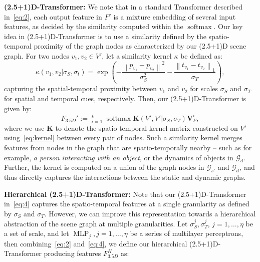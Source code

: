 \documentclass[letterpaper]{article} \usepackage{aaai22}  \usepackage{times}  \usepackage{helvet}  \usepackage{courier}  \usepackage[hyphens]{url}  \usepackage{graphicx} \urlstyle{rm} \def\UrlFont{\rm}  \usepackage{natbib}  \usepackage{caption} \DeclareCaptionStyle{ruled}{labelfont=normalfont,labelsep=colon,strut=off} \frenchspacing  \setlength{\pdfpagewidth}{8.5in}  \setlength{\pdfpageheight}{11in}  \usepackage{algorithm}
\newcommand{\graph}{\mathcal{G}}
\newcommand{\feat}{F}
\newcommand{\ftd}{F_{3.5D}}
\newcommand{\fhd}{F^H_{3.5D}}
\newcommand{\val}{\mathbf{V}}
\DeclareMathOperator*{\softmax}{softmax}
\DeclareMathOperator*{\concat}{||}
\DeclareMathOperator*{\MLP}{MLP}
\newcommand{\name}{(2.5+1)D\xspace}
\newcommand{\nameTxr}{(2.5+1)D-Transformer\xspace}
\newcommand{\nodes}{V}
\newcommand{\node}{v}
\newcommand{\kernel}{\kappa}
\newcommand{\Kernel}{\mathbf{K}}
\newcommand{\lnorm}[1]{\left\|{#1}\right\|_1}
\newcommand{\enorm}[1]{\left\|{#1}\right\|}
\begin{document}
\noindent\textbf{\nameTxr:}
We note that in a standard Transformer described in~\eqref{eq:2}, each output feature in $\feat'$ is a mixture embedding of several input features, as decided by the similarity computed within the $\softmax$.
Our key idea in \nameTxr is to use a similarity defined by the spatio-temporal proximity of the graph nodes as characterized by our \name scene graph. For two nodes $\node_1,\node_2 \in \nodes'$, let a similarity kernel $\kernel$ be defined as:
\begin{equation}
    \kernel(\node_1, \node_2 | \sigma_S, \sigma_t) = \exp\!\!\left(-\frac{\enorm{p_{\node_1} - p_{\node_2}}^2}{\sigma_S^2}-\frac{\lnorm{t_{\node_1} - t_{\node_2}}}{\sigma_T}\!\!\right),
    \label{eq:kernel}
\end{equation}
capturing the spatial-temporal proximity between $\node_1$ and $\node_2$ for scales $\sigma_S$ and $\sigma_T$ for spatial and temporal cues, respectively. Then, our \nameTxr is given by:
\begin{equation}
   \ftd' := \concat_{i=1}^k \softmax \Kernel(\nodes', \nodes'|\sigma_S,\sigma_T)\val^i_F,
   \label{eq:4}
\end{equation}
where we use $\Kernel$ to denote the spatio-temporal kernel matrix constructed on $\nodes'$ using~\eqref{eq:kernel} between every pair of nodes. Such a similarity kernel merges features from nodes in the graph that are spatio-temporally nearby -- such as for example, \emph{a person interacting with an object}, or the dynamics of objects in $\graph_d$. Further, the kernel is computed on a union of the graph nodes in $\graph_{s'}$ and $\graph_{d}$, and thus directly captures the interactions between the static and dynamic graphs. 

\noindent\textbf{Hierarchical \nameTxr:}
Note that our \nameTxr in~\eqref{eq:4} captures the spatio-temporal features at a single granularity as defined by $\sigma_S$ and $\sigma_T$. However, we can improve this representation towards a hierarchical abstraction of the scene graph at multiple granularities. Let $\sigma^j_S, \sigma^j_T$, $j=1,\dots, \eta$ be a set of scale, and let $\MLP_j, j=1,\dots, \eta$ be a series of multilayer perceptrons, then combining~\eqref{eq:2} and~\eqref{eq:4}, we define our hierarchical \nameTxr producing features $\fhd$ as:
\end{document}
